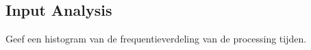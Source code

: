 \documentclass[11pt,a4paper]{article}
\begin{document}
\subsection{Input Analysis}
Geef een histogram van de frequentieverdeling van de processing tijden.



\end{document}
